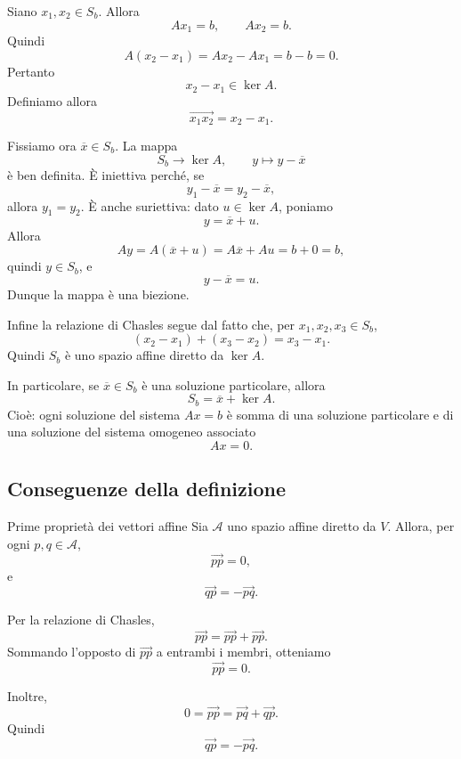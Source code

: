\documentclass[a4paper]{article}
\begin{document}
\begin{snippetproof}{}
    Siano \(x_1,x_2\in S_b\). Allora
    \[
        Ax_1=b,
        \qquad
        Ax_2=b.
    \]
    Quindi
    \[
        A(x_2-x_1)=Ax_2-Ax_1=b-b=0.
    \]
    Pertanto
    \[
        x_2-x_1\in\ker A.
    \]
    Definiamo allora
    \[
        \overrightarrow{x_1x_2}=x_2-x_1.
    \]

    Fissiamo ora \(\overline{x}\in S_b\). La mappa
    \[
        S_b\to\ker A,
        \qquad
        y\mapsto y-\overline{x}
    \]
    è ben definita. È iniettiva perché, se
    \[
        y_1-\overline{x}=y_2-\overline{x},
    \]
    allora \(y_1=y_2\). È anche suriettiva: dato \(u\in\ker A\), poniamo
    \[
        y=\overline{x}+u.
    \]
    Allora
    \[
        Ay=A(\overline{x}+u)=A\overline{x}+Au=b+0=b,
    \]
    quindi \(y\in S_b\), e
    \[
        y-\overline{x}=u.
    \]
    Dunque la mappa è una biezione.

    Infine la relazione di Chasles segue dal fatto che, per \(x_1,x_2,x_3\in S_b\),
    \[
        (x_2-x_1)+(x_3-x_2)=x_3-x_1.
    \]
    Quindi \(S_b\) è uno spazio affine diretto da \(\ker A\).
\end{snippetproof}

In particolare, se \(\overline{x}\in S_b\) è una soluzione particolare, allora
\[
    S_b=\overline{x}+\ker A.
\]
Cioè: ogni soluzione del sistema \(Ax=b\) è somma di una soluzione particolare e di una soluzione del sistema omogeneo associato
\[
    Ax=0.
\]

\subsection{Conseguenze della definizione}

\begin{snippetproposition}{Prime proprietà dei vettori affine}
    Sia \(\mathcal{A}\) uno spazio affine diretto da \(V\). Allora, per ogni \(p,q\in\mathcal{A}\),
    \[
        \overrightarrow{pp}=0,
    \]
    e
    \[
        \overrightarrow{qp}=-\overrightarrow{pq}.
    \]
\end{snippetproposition}

\begin{snippetproof}{}
    Per la relazione di Chasles,
    \[
        \overrightarrow{pp}
        =
        \overrightarrow{pp}
        +
        \overrightarrow{pp}.
    \]
    Sommando l'opposto di \(\overrightarrow{pp}\) a entrambi i membri, otteniamo
    \[
        \overrightarrow{pp}=0.
    \]

    Inoltre,
    \[
        0=\overrightarrow{pp}
        =
        \overrightarrow{pq}
        +
        \overrightarrow{qp}.
    \]
    Quindi
    \[
        \overrightarrow{qp}=-\overrightarrow{pq}.
    \]
\end{snippetproof}
\end{document}
